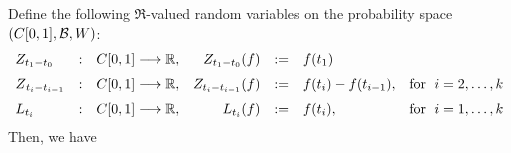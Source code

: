 \vskip 0.3cm
\noindent
Define the following $\Re$-valued random variables on the probability space $\left(C[0,1],\mathcal{B},W\right)$:
\begin{equation*}
\begin{array}{lclrcll}
Z_{t_{1}-t_{0}} &:& \Czo \longrightarrow \Re, & Z_{t_{1}-t_{0}}(f) & := & f(t_{1}) \\
\overset{{\color{white}1}}{Z}_{t_{i}-t_{i-1}} &:& \Czo \longrightarrow \Re, & Z_{t_{i}-t_{i-1}}(f) & := & f(t_{i}) - f(t_{i-1}), & \textnormal{for \;$i = 2, \ldots, k$} \\
\overset{{\color{white}1}}{L}_{t_{i}} &:& \Czo \longrightarrow \Re, & L_{t_{i}}(f) & := & f(t_{i}), & \textnormal{for \;$i = 1, \ldots, k$} \\
\end{array}
\end{equation*}
Then, we have
